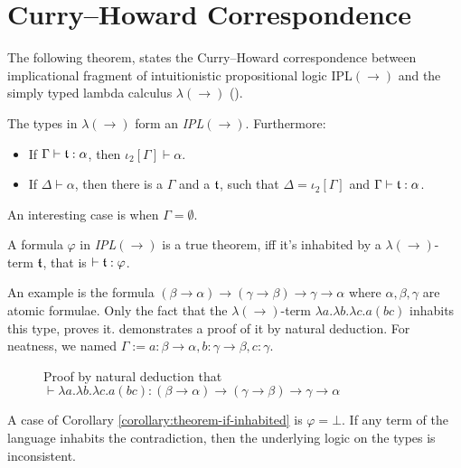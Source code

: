 \section{Curry--Howard Correspondence}

The following theorem, states the Curry--Howard correspondence between implicational fragment of intuitionistic propositional logic IPL$(\rightarrow)$ and the simply typed lambda calculus $\lambda(\rightarrow)$ (\cite{Howard1969TheFN}).

\begin{theorem}
The types in $\lambda(\rightarrow)$ form an \emph{IPL}$(\rightarrow)$. Furthermore:
\begin{itemize}
    \item If $\Gamma \vdash \mathfrak{t} : \alpha$, then $\iota_2[\Gamma] \vdash \alpha$.
    \item If $\Delta \vdash \alpha$, then there is a $\Gamma$ and a $\mathfrak{t}$, such that $\Delta = \iota_2[\Gamma]$ and $\Gamma \vdash \mathfrak{t} : \alpha$. \qedhere
\end{itemize}
\end{theorem}

An interesting case is when $\Gamma = \emptyset$.

\begin{corollary}
\label{corollary:theorem-if-inhabited}
A formula $\varphi$ in \emph{IPL}$(\rightarrow)$ is a true theorem, iff it's inhabited by a $\lambda(\rightarrow)$-term $\mathfrak{t}$, that is $\vdash \mathfrak{t} : \varphi$.
\end{corollary}

An example is the formula $(\beta \rightarrow \alpha) \rightarrow (\gamma \rightarrow \beta) \rightarrow \gamma \rightarrow \alpha$ where $\alpha, \beta, \gamma$ are atomic formulae. Only the fact that the $\lambda(\rightarrow)$-term $\lambda a. \lambda b. \lambda c. a (b c)$ inhabits this type, proves it.  demonstrates a proof of it by natural deduction. For neatness, we named $\Gamma := a : \beta \rightarrow \alpha, b : \gamma \rightarrow \beta, c : \gamma$.

\begin{figure}
    \centering
    
    \caption{Proof by natural deduction that $\vdash \lambda a. \lambda b. \lambda c. a (b c) : (\beta \rightarrow \alpha) \rightarrow (\gamma \rightarrow \beta) \rightarrow \gamma \rightarrow \alpha$}
    \label{fig:curry-howard-example}
\end{figure}

A case of Corollary \ref{corollary:theorem-if-inhabited} is $\varphi = \bot$. If any term of the language inhabits the contradiction, then the underlying logic on the types is inconsistent.